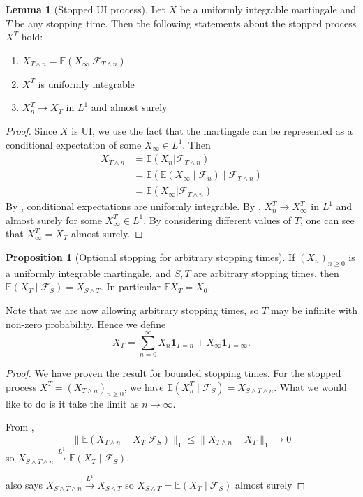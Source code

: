 \documentclass[parskip=full]{article}
\theoremstyle{definition}
\newtheorem{proposition}{Proposition}[section]
\newtheorem{lemma}{Lemma}[proposition]
\newcommand{\1}{\mathbbm{1}}
\newcommand{\E}{\mathbb{E}}
\begin{document}
\begin{lemma}[Stopped UI process] \label{Stopped UI process}
  Let $X$ be a uniformly integrable martingale and $T$ be any stopping time. Then the following statements about the stopped process $X^T$ hold:
  \begin{enumerate}
    \item $X_{T \wedge n} = \E (X_\infty | \mathcal{F}_{T \wedge n})$
    \item $X^T$ is uniformly integrable
    \item $X^T_n \to X_T$ in $L^1$ and almost surely
  \end{enumerate}
\end{lemma}

\begin{proof}
  Since $X$ is UI, we use the fact that the martingale can be represented as a conditional expectation of some $X_\infty \in L^1$. Then
  \begin{align*}
    X_{T \wedge n} &= \E(X_n | \mathcal{F}_{T \wedge n}) \\
                   &= \E (\E(X_\infty \mid \mathcal{F}_n) \mid \mathcal{F}_{T \wedge n}) \\
                   &= \E (X_\infty | \mathcal{F}_{T \wedge n})
  \end{align*}
  By , conditional expectations are uniformly integrable. By , $X^T_n \to X^T_\infty$ in $L^1$ and almost surely for some $X^T_\infty \in L^1$. By considering different values of $T$, one can see that $X^T_\infty = X_T$ almost surely.
\end{proof}

\begin{proposition}[Optional stopping for arbitrary stopping times]
  If $(X_n)_{n \geq 0}$ is a uniformly integrable martingale, and $S, T$ are arbitrary stopping times, then $\E(X_T \mid \mathcal{F}_S) = X_{S \wedge T}$. In particular $\E X_T = X_0$.
  
  Note that we are now allowing arbitrary stopping times, so $T$ may be infinite with non-zero probability. Hence we define
\[
  X_T = \sum_{n = 0}^\infty X_n \mathbf{1}_{T = n} + X_\infty \mathbf{1}_{T = \infty}.
\]
\end{proposition}

\begin{proof}
  We have proven the result for bounded stopping times. For the stopped process $X^T = (X_{T \wedge n})_{n \geq 0}$, we have $\E(X^T_n \mid \mathcal{F}_S) = X_{S \wedge T \wedge n}$. What we would like to do is it take the limit as $n \to \infty$.

From , 
  \[
    \|\E(X_{T \wedge n} - X_{T} | \mathcal{F}_S)\|_1 \leq \|X_{T \wedge n} - X_{T}\|_1 \to 0
  \]
  so $X_{S \wedge T \wedge n} \xrightarrow{L^1} \E(X_T \mid \mathcal{F}_S)$.

   also says $X_{S \wedge T \wedge n} \xrightarrow{L^1} X_{S \wedge T}$ so $X_{S \wedge T} = \E(X_T \mid \mathcal{F}_S)$ almost surely
\end{proof}
\end{document}
